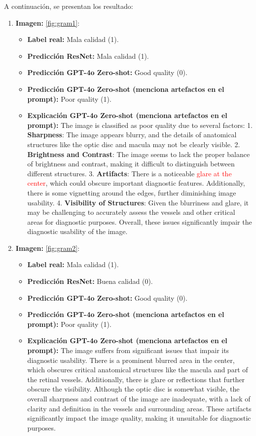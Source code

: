 A continuación, se presentan los resultado:

\begin{enumerate}
	\item \textbf{Imagen:} \ref{fig:gram1}:
	\begin{itemize}
		\item \textbf{Label real:} Mala calidad (1).
		\item \textbf{Predicción ResNet:} Mala calidad (1).
		\item \textbf{Predicción GPT-4o Zero-shot:} Good quality (0).
		\item \textbf{Predicción GPT-4o Zero-shot (menciona artefactos en el prompt):} Poor quality (1).
		\item \textbf{Explicación GPT-4o Zero-shot (menciona artefactos en el prompt):} The image is classified as poor quality due to several factors: 
		1. \textbf{Sharpness}: The image appears blurry, and the details of anatomical structures like the optic disc and macula may not be clearly visible.
		2. \textbf{Brightness and Contrast}: The image seems to lack the proper balance of brightness and contrast, making it difficult to distinguish between different structures.
		3. \textbf{Artifacts}: There is a noticeable \textcolor{red}{glare at the center}, which could obscure important diagnostic features. Additionally, there is some vignetting around the edges, further diminishing image usability.
		4. \textbf{Visibility of Structures}: Given the blurriness and glare, it may be challenging to accurately assess the vessels and other critical areas for diagnostic purposes. Overall, these issues significantly impair the diagnostic usability of the image.
	\end{itemize}
	\item \textbf{Imagen:} \ref{fig:gram2}:
	\begin{itemize}
		\item \textbf{Label real:} Mala calidad (1).
		\item \textbf{Predicción ResNet:} Buena calidad (0).
		\item \textbf{Predicción GPT-4o Zero-shot:} Good quality (0).
		\item \textbf{Predicción GPT-4o Zero-shot (menciona artefactos en el prompt):} Poor quality (1).
		\item \textbf{Explicación GPT-4o Zero-shot (menciona artefactos en el prompt):} The image suffers from significant issues that impair its diagnostic usability. There is a prominent blurred area in the center, which obscures critical anatomical structures like the macula and part of the retinal vessels. Additionally, there is glare or reflections that further obscure the visibility. Although the optic disc is somewhat visible, the overall sharpness and contrast of the image are inadequate, with a lack of clarity and definition in the vessels and surrounding areas. These artifacts significantly impact the image quality, making it unsuitable for diagnostic purposes.

\end{itemize}
\end{enumerate}
